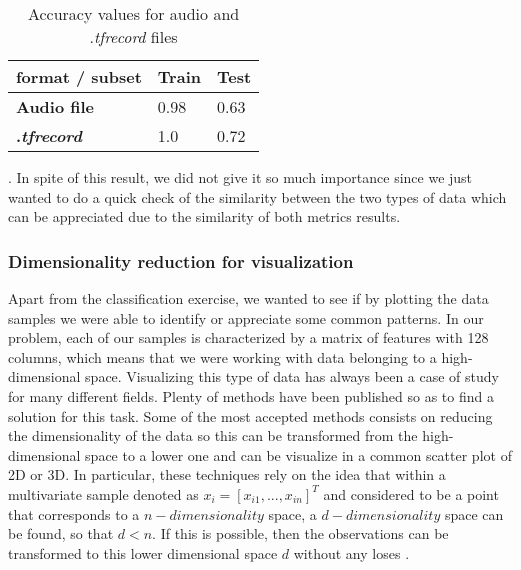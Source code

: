 	\begin{table}[h]
	\begin{center}
		\centering
		\begin{tabular}{|| m{7em} | m{7em} | m{7em} ||}
			\hline
			format / subset & \textbf{Train} & \textbf{Test} \\
			\hline\hline
			\textbf{Audio file} & 0.98 & 0.63 \\
			\hline
			\textbf{.\textit{tfrecord}} & 1.0 & 0.72 \\
			\hline
		\end{tabular}
	\end{center}
	\caption{Accuracy values for audio and .\textit{tfrecord} files}
	\label{table:5}
	\end{table}

	. In spite of this result, we did not give it so much importance since we just wanted to do a quick check of the similarity between the two types of data which can be appreciated due to the similarity of both metrics results.
	
\subsubsection{Dimensionality reduction for visualization}
\label{subsection:dimensionality-reduction-for-visualization}
	
	Apart from the classification exercise, we wanted to see if by plotting the data samples we were able to identify or appreciate some common patterns. In our problem, each of our samples is characterized by a matrix of features with 128 columns, which means that we were working with data belonging to a high-dimensional space. Visualizing this type of data has always been a case of study for many different fields. Plenty of methods have been published so as to find a solution for this task. Some of the most accepted methods consists on reducing the dimensionality of the data so this can be transformed from the high-dimensional space to a lower one and can be visualize in a common scatter plot of 2D or 3D. In particular, these techniques rely on the idea that within a multivariate sample denoted as $x_i = [x_{i1},..., x_{in}]^T$ and considered to be a point that corresponds to a $n-dimensionality$ space, a $d-dimensionality$ space can be found, so that $d < n$. %
	If this is possible, then the observations can be transformed to this lower dimensional space $d$ without any loses \cite{Kaski2011}. 
	
